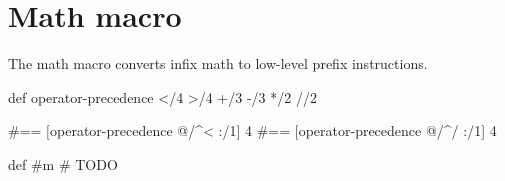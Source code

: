 \documentclass{report}
\begin{document}
\chapter{Math macro}\label{chp:math-macro}
  The math macro converts infix math to low-level prefix instructions.

\begin{xhcode}
def operator-precedence {</4 >/4 +/3 -/3 */2 {/}/2}

#== $[$operator-precedence @/^< :/1] 4
#== $[$operator-precedence @/^{/} :/1] 4

def #m {
  # TODO
} \end{xhcode}
\end{document}
